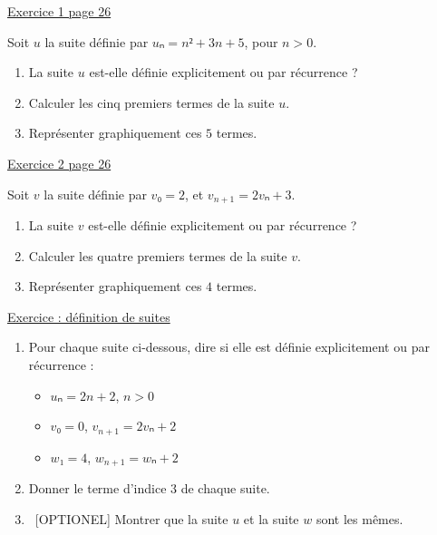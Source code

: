 \documentclass{automatisme}
\begin{document}
\begin{frame}
	\uline{\Large{Exercice 1 page 26}} \bigskip

	Soit $u$ la suite définie par $uₙ = n² + 3n + 5$, pour $n > 0$.
	\begin{enumerate}
		\item La suite $u$ est-elle définie explicitement ou par récurrence ?
		\item Calculer les cinq premiers termes de la suite $u$.
		\item Représenter graphiquement ces $5$ termes.
	\end{enumerate} \vfill

	\uline{\Large{Exercice 2 page 26}} \bigskip

	Soit $v$ la suite définie par $v₀ = 2$, et $v_{n+1} = 2vₙ + 3$.
	\begin{enumerate}
		\item La suite $v$ est-elle définie explicitement ou par récurrence ?
		\item Calculer les quatre premiers termes de la suite $v$.
		\item Représenter graphiquement ces $4$ termes.
	\end{enumerate}
\end{frame}

\begin{frame}
	{\Large\uline{Exercice : définition de suites}}

	\begin{enumerate}
		\item Pour chaque suite ci-dessous, dire si elle est définie explicitement ou par récurrence :
		      \begin{itemize}
			      \setlength{\itemsep}{0.8em}
			      \item $uₙ = 2n + 2$, $n > 0$
			      \item $v₀ = 0$, $v_{n+1} = 2vₙ + 2$
			      \item $w₁ = 4$, $w_{n+1} = wₙ + 2$
		      \end{itemize}
		\item Donner le terme d'indice $3$ de chaque suite.
		\item \ [OPTIONEL] Montrer que la suite $u$ et la suite $w$ sont les mêmes.
	\end{enumerate}
\end{frame}
\end{document}
